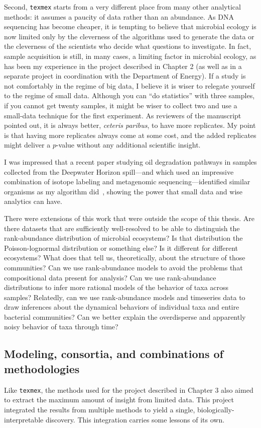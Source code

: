 Second, \texttt{texmex} starts from a very different place from many other
analytical methods: it assumes a paucity of data rather than an abundance.
As DNA sequencing has become cheaper, it is tempting to believe that microbial
ecology is now limited only by the cleverness of the algorithms used to generate
the data or the cleverness of the scientists who decide what questions to
investigate. In fact, sample acquisition is still, in many cases, a limiting
factor in microbial ecology, as has been my experience in the project described
in Chapter 2 (as well as in a separate project in coordination with the Department
of Energy).
If a study is not comfortably in the regime of
big data, I believe it is wiser to relegate yourself to the regime of small
data. Although you can ``do statistics'' with three samples, if you cannot
get twenty samples, it might be wiser to collect two and use a small-data
technique for the first experiment. As reviewers of the manuscript pointed
out, it is always better, \textit{ceteris paribus}, to have more replicates.
My point is that having more replicates always come at some cost, and the
added replicates might deliver a $p$-value without any additional scientific insight.

I was impressed that a recent paper studying oil degradation pathways in
samples collected from the Deepwater Horizon spill---and which used an impressive
combination of isotope labeling and metagenomic sequencing---identified similar organisms
as my algorithm did~\cite{dombrowski_reconstructing_2016}, showing the power
that small data and wise analytics can have.

There were extensions of this work that were outside the scope of this
thesis. Are there datasets that are sufficiently well-resolved to be able
to distinguish the rank-abundance distribution of microbial ecosystems?
Is that distribution the Poisson-lognormal distribution or something else? Is it different
for different ecosystems? What does that tell us, theoretically,
about the structure of those communities? Can we use rank-abundance models
to avoid the problems that compositional data present for analysis?
Can we use rank-abundance distributions to infer more rational models of
the behavior of taxa across samples? Relatedly, can we use rank-abundance
models and timeseries data to draw inferences about the dynamical behaviors
of individual taxa and entire bacterial communities? Can we better explain
the overdisperse and apparently noisy behavior of taxa through time?

\subsection{Modeling, consortia, and combinations of methodologies}
Like \texttt{texmex},
the methods used for the project described in Chapter 3 also aimed to extract the maximum amount of
insight from limited data. This project integrated the results from
multiple methods to yield a single, biologically-interpretable discovery.
This integration carries some lessons of its own.


